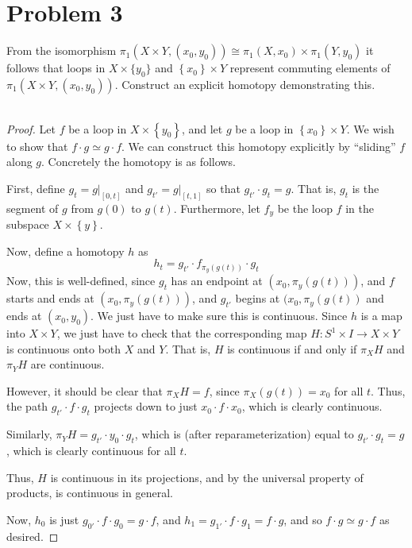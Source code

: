 \documentclass[fontsize=11pt]{scrartcl} %
\numberwithin{equation}{section} %
\numberwithin{figure}{section} %
\numberwithin{table}{section} %
\begin{document}
\section*{Problem 3}
From the isomorphism $\pi_1(X\times Y, (x_0,y_0))\cong
\pi_1(X,x_0)\times\pi_1\left( Y,y_0 \right)$ it follows that loops in
$X\times\{y_0\}$ and $\left\{ x_0 \right\}\times Y$ represent commuting elements
of $\pi_1\left( X\times Y,\left( x_0,y_0 \right) \right)$. Construct an explicit
homotopy demonstrating this.
\\
\\
\begin{proof}
    Let $f$ be a loop in $X\times\left\{ y_0 \right\}$, and let $g$ be a loop in
    $\left\{ x_0 \right\}\times Y$. We wish to show that $f\cdot g \simeq g\cdot
    f$. We can construct this homotopy explicitly by ``sliding'' $f$ along $g$.
    Concretely the homotopy is as follows.

    First, define $g_t = g\Big|_{[0,t]}$ and $g_{t'} = g\Big|_{[t,1]}$ so that
    $g_{t'}\cdot g_t = g$. That is, $g_t$ is the segment of $g$ from $g(0)$ to
    $g(t)$. Furthermore, let $f_y$ be the loop $f$ in the subspace
    $X\times\left\{ y \right\}$.

    Now, define a homotopy $h$ as
    \begin{equation}
        h_t = g_{t'}\cdot f_{\pi_y(g(t))}\cdot g_t
    \end{equation}
    Now, this is well-defined, since $g_t$ has an endpoint at
    $(x_0,\pi_y(g(t)))$, and $f$ starts and ends at $(x_0,\pi_y(g(t)))$, and
    $g_{t'}$ begins at $(x_0,\pi_y(g(t))$ and ends at $(x_0,y_0)$. We just have
        to make sure this is continuous. Since $h$ is a map into $X\times Y$, we
        just have to check that the corresponding map $H:S^1\times I \to X\times
        Y$ is continuous onto both $X$ and $Y$. That is, $H$ is continuous if
        and only if $\pi_X H$ and $\pi_Y H$ are continuous.

    However, it should be clear that $\pi_X H = f$, since $\pi_X(g(t)) = x_0$
    for all $t$. Thus, the path $g_{t'}\cdot f \cdot g_t$ projects down to just
    $x_0\cdot f\cdot x_0$, which is clearly continuous. 
    
    Similarly, $\pi_Y H = g_{t'}\cdot y_0\cdot g_t$, which is (after
    reparameterization) equal to $g_{t'}\cdot g_t = g$, which is clearly
    continuous for all $t$.

    Thus, $H$ is continuous in its projections, and by the universal property of
    products, is continuous in general.

    Now, $h_0$ is just $g_{0'}\cdot f\cdot g_0 = g\cdot f$, and $h_1 =
    g_{1'}\cdot f\cdot g_1 = f\cdot g$, and so $f\cdot g \simeq g\cdot f$ as
    desired.
\end{proof}
\end{document}

